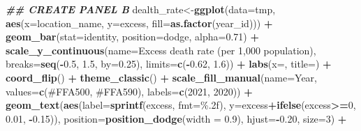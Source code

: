 \documentclass[
]{article}
\newenvironment{Shaded}{\begin{snugshade}}{\end{snugshade}}
\newcommand{\AttributeTok}[1]{\textcolor[rgb]{0.13,0.29,0.53}{#1}}
\newcommand{\DecValTok}[1]{\textcolor[rgb]{0.00,0.00,0.81}{#1}}
\newcommand{\DocumentationTok}[1]{\textcolor[rgb]{0.56,0.35,0.01}{\textbf{\textit{#1}}}}
\newcommand{\FloatTok}[1]{\textcolor[rgb]{0.00,0.00,0.81}{#1}}
\newcommand{\FunctionTok}[1]{\textcolor[rgb]{0.13,0.29,0.53}{\textbf{#1}}}
\newcommand{\NormalTok}[1]{#1}
\newcommand{\OtherTok}[1]{\textcolor[rgb]{0.56,0.35,0.01}{#1}}
\newcommand{\SpecialCharTok}[1]{\textcolor[rgb]{0.81,0.36,0.00}{\textbf{#1}}}
\newcommand{\StringTok}[1]{\textcolor[rgb]{0.31,0.60,0.02}{#1}}
\begin{document}
\begin{Shaded}
\begin{Highlighting}[]
\DocumentationTok{\#\# CREATE PANEL B}
\NormalTok{dealth\_rate}\OtherTok{\textless{}{-}}\FunctionTok{ggplot}\NormalTok{(}\AttributeTok{data=}\NormalTok{tmp, }\FunctionTok{aes}\NormalTok{(}\AttributeTok{x=}\NormalTok{location\_name, }\AttributeTok{y=}\NormalTok{excess, }\AttributeTok{fill=}\FunctionTok{as.factor}\NormalTok{(year\_id))) }\SpecialCharTok{+}
  \FunctionTok{geom\_bar}\NormalTok{(}\AttributeTok{stat=}\StringTok{\textquotesingle{}identity\textquotesingle{}}\NormalTok{, }\AttributeTok{position=}\StringTok{\textquotesingle{}dodge\textquotesingle{}}\NormalTok{, }\AttributeTok{alpha=}\FloatTok{0.71}\NormalTok{) }\SpecialCharTok{+}
  \FunctionTok{scale\_y\_continuous}\NormalTok{(}\AttributeTok{name=}\StringTok{\textquotesingle{}Excess death rate (per 1,000 population)\textquotesingle{}}\NormalTok{, }\AttributeTok{breaks=}\FunctionTok{seq}\NormalTok{(}\SpecialCharTok{{-}}\FloatTok{0.5}\NormalTok{, }\FloatTok{1.5}\NormalTok{, }\AttributeTok{by=}\FloatTok{0.25}\NormalTok{), }\AttributeTok{limits=}\FunctionTok{c}\NormalTok{(}\SpecialCharTok{{-}}\FloatTok{0.62}\NormalTok{, }\FloatTok{1.6}\NormalTok{)) }\SpecialCharTok{+}
  \FunctionTok{labs}\NormalTok{(}\AttributeTok{x=}\StringTok{\textquotesingle{}\textquotesingle{}}\NormalTok{, }\AttributeTok{title=}\StringTok{\textquotesingle{}\textquotesingle{}}\NormalTok{) }\SpecialCharTok{+} \FunctionTok{coord\_flip}\NormalTok{() }\SpecialCharTok{+} \FunctionTok{theme\_classic}\NormalTok{() }\SpecialCharTok{+}
  \FunctionTok{scale\_fill\_manual}\NormalTok{(}\AttributeTok{name=}\StringTok{\textquotesingle{}Year\textquotesingle{}}\NormalTok{, }\AttributeTok{values=}\FunctionTok{c}\NormalTok{(}\StringTok{\textquotesingle{}\#FFA500\textquotesingle{}}\NormalTok{, }\StringTok{\textquotesingle{}\#FFA590\textquotesingle{}}\NormalTok{), }\AttributeTok{labels=}\FunctionTok{c}\NormalTok{(}\StringTok{\textquotesingle{}2021\textquotesingle{}}\NormalTok{, }\StringTok{\textquotesingle{}2020\textquotesingle{}}\NormalTok{)) }\SpecialCharTok{+}
  \FunctionTok{geom\_text}\NormalTok{(}\FunctionTok{aes}\NormalTok{(}\AttributeTok{label=}\FunctionTok{sprintf}\NormalTok{(excess, }\AttributeTok{fmt=}\StringTok{\textquotesingle{}\%.2f\textquotesingle{}}\NormalTok{), }\AttributeTok{y=}\NormalTok{excess}\SpecialCharTok{+}\FunctionTok{ifelse}\NormalTok{(excess}\SpecialCharTok{\textgreater{}=}\DecValTok{0}\NormalTok{, }\FloatTok{0.01}\NormalTok{, }\SpecialCharTok{{-}}\FloatTok{0.15}\NormalTok{)), }
            \AttributeTok{position=}\FunctionTok{position\_dodge}\NormalTok{(}\AttributeTok{width =} \FloatTok{0.9}\NormalTok{), }\AttributeTok{hjust=}\SpecialCharTok{{-}}\FloatTok{0.20}\NormalTok{, }\AttributeTok{size=}\DecValTok{3}\NormalTok{) }\SpecialCharTok{+}

\end{Highlighting}
\end{Shaded}
\end{document}
